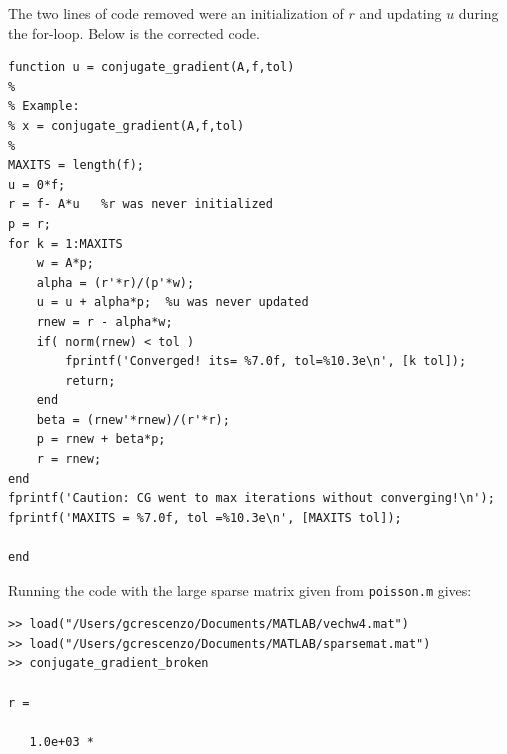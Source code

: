 \documentclass[10pt,oneside,openany]{memoir}
\begin{document}
    \begin{solution}
        The two lines of code removed were an initialization of $r$ and updating $u$ during the for-loop. Below is the corrected code.
        \begin{lstlisting}[style=MatlabEditorGrey]
function u = conjugate_gradient(A,f,tol)
%
% Example:
% x = conjugate_gradient(A,f,tol)
%
MAXITS = length(f);
u = 0*f;
r = f- A*u   %r was never initialized
p = r;
for k = 1:MAXITS
    w = A*p;
    alpha = (r'*r)/(p'*w);
    u = u + alpha*p;  %u was never updated
    rnew = r - alpha*w;
    if( norm(rnew) < tol )
        fprintf('Converged! its= %7.0f, tol=%10.3e\n', [k tol]);
        return;
    end
    beta = (rnew'*rnew)/(r'*r);
    p = rnew + beta*p;
    r = rnew;
end
fprintf('Caution: CG went to max iterations without converging!\n');
fprintf('MAXITS = %7.0f, tol =%10.3e\n', [MAXITS tol]);

end
        \end{lstlisting}
Running the code with the large sparse matrix given from \texttt{poisson.m} gives:
\newpage
    \begin{lstlisting}[style=Matlab-console]
>> load("/Users/gcrescenzo/Documents/MATLAB/vechw4.mat")
>> load("/Users/gcrescenzo/Documents/MATLAB/sparsemat.mat")
>> conjugate_gradient_broken

r =

   1.0e+03 *


\end{lstlisting}
\end{solution}
\end{document}

